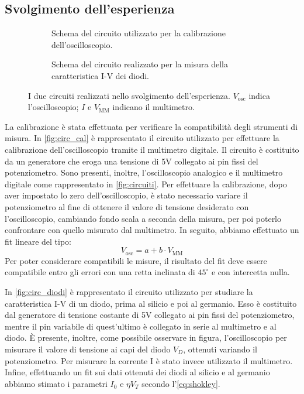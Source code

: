 \subsection{Svolgimento dell'esperienza}
\begin{figure}[htb]
    \centering
    \begin{subfigure}{.45\textwidth}
    \centering
        
        \caption{Schema del circuito utilizzato per la calibrazione dell'oscilloscopio.}
        \label{fig:circ_cal}
    \end{subfigure}
    \hspace{1cm}
    \begin{subfigure}{.45\textwidth}
        \centering
        
        \caption{Schema del circuito realizzato per la misura della caratteristica I-V dei diodi.}
        \label{fig:circ_diodi}
    \end{subfigure}
    \caption{I due circuiti realizzati nello svolgimento dell'esperienza. $V_\text{osc}$ indica l'oscilloscopio; $I$ e $V_\text{MM}$ indicano il multimetro.}
    \label{fig:circuiti}
\end{figure}

La calibrazione è stata effettuata per verificare la compatibilità degli strumenti di misura. In \autoref{fig:circ_cal} è rappresentato il circuito utilizzato per effettuare la calibrazione dell’oscilloscopio tramite il multimetro digitale. Il circuito è costituito da un generatore che eroga una tensione di 5\si{\volt} collegato ai pin fissi del potenziometro. Sono presenti, inoltre, l’oscilloscopio analogico e il multimetro digitale come rappresentato in \autoref{fig:circuiti}.
Per effettuare la calibrazione, dopo aver impostato lo zero dell’oscilloscopio, è stato necessario variare il potenziometro al fine di ottenere il valore di tensione desiderato con l’oscilloscopio, cambiando fondo scala a seconda della misura, per poi poterlo confrontare con quello misurato dal multimetro. In seguito, abbiamo effettuato un fit lineare del tipo:
\begin{equation} \label{eq:cal}
    V_\text{osc} = a + b \cdot V_\text{MM}
\end{equation}
Per poter considerare compatibili le misure, il risultato del fit deve essere compatibile entro gli errori con una retta inclinata di $45^\circ$ e con intercetta nulla.

In \autoref{fig:circ_diodi} è rappresentato il circuito utilizzato per studiare la caratteristica I-V di un diodo, prima al silicio e poi al germanio. Esso è costituito dal generatore di tensione costante di 5\si{\volt} collegato ai pin fissi del potenziometro, mentre il pin variabile di quest’ultimo è collegato in serie al multimetro e al diodo. È presente, inoltre, come possibile osservare in figura, l’oscilloscopio per misurare il valore di tensione ai capi del diodo $V_D$, ottenuti variando il potenziometro. Per misurare la corrente I è stato invece utilizzato il multimetro. Infine, effettuando un fit sui dati ottenuti dei diodi al silicio e al germanio abbiamo stimato i parametri $I_0$ e $\eta V_T$ secondo l'\autoref{eq:shokley}. 